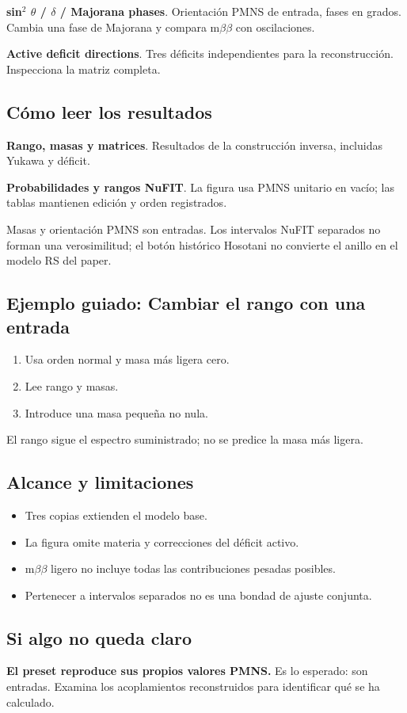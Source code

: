 \documentclass[11pt,a4paper]{article}
\begin{document}
\textbf{sin\ensuremath{{}^{2}} \ensuremath{\theta} / \ensuremath{\delta} / Majorana phases}. Orientación PMNS de entrada, fases en grados. Cambia una fase de Majorana y compara m\ensuremath{\beta}\ensuremath{\beta} con oscilaciones.

\textbf{Active deficit directions}. Tres déficits independientes para la reconstrucción. Inspecciona la matriz completa.

\subsection*{Cómo leer los resultados}
\textbf{Rango, masas y matrices}. Resultados de la construcción inversa, incluidas Yukawa y déficit.

\textbf{Probabilidades y rangos NuFIT}. La figura usa PMNS unitario en vacío; las tablas mantienen edición y orden registrados.

Masas y orientación PMNS son entradas. Los intervalos NuFIT separados no forman una verosimilitud; el botón histórico Hosotani no convierte el anillo en el modelo RS del paper.
\subsection*{Ejemplo guiado: Cambiar el rango con una entrada}
\begin{enumerate}
\item Usa orden normal y masa más ligera cero.
\item Lee rango y masas.
\item Introduce una masa pequeña no nula.
\end{enumerate}
El rango sigue el espectro suministrado; no se predice la masa más ligera.
\subsection*{Alcance y limitaciones}
\begin{itemize}
\item Tres copias extienden el modelo base.
\item La figura omite materia y correcciones del déficit activo.
\item m\ensuremath{\beta}\ensuremath{\beta} ligero no incluye todas las contribuciones pesadas posibles.
\item Pertenecer a intervalos separados no es una bondad de ajuste conjunta.
\end{itemize}
\subsection*{Si algo no queda claro}
\textbf{El preset reproduce sus propios valores PMNS.} Es lo esperado: son entradas. Examina los acoplamientos reconstruidos para identificar qué se ha calculado.
\end{document}
